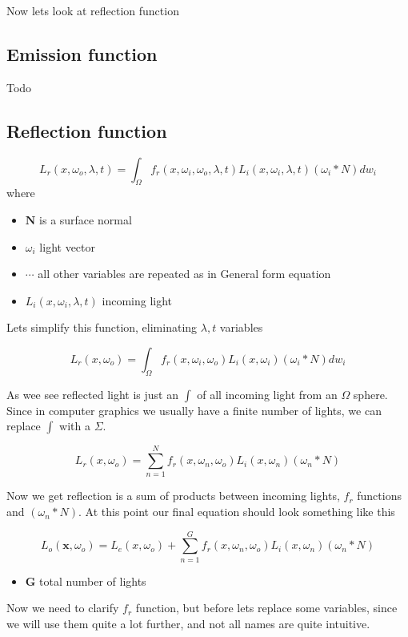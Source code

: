 \documentclass{article}
\begin{document}
Now lets look at reflection function

\subsection{Emission function}
Todo

\subsection{Reflection function}
\[
L_{r}(x, \omega_{o}, \lambda, t) = \int _{\Omega } f_r(x, \omega_{i}, \omega_{o}, \lambda, t) L_{i}(x, \omega_{i}, \lambda, t) (\omega_{i} * N) dw_{i}
\]
where
\begin{itemize}
    \item $\textbf{N}$ is a surface normal
    \item $\omega_{i}$ light vector
    \item $\cdots$ all other variables are repeated as in General form equation
    \item $L_{i}(x, \omega_{i}, \lambda, t)$ incoming light 
\end{itemize}

Lets simplify this function, eliminating $\lambda, t$ variables

\[
L_{r}(x, \omega_{o}) = \int _{\Omega } f_r(x, \omega_{i}, \omega_{o}) L_{i}(x, \omega_{i}) (\omega_{i} * N) dw_{i}
\]


As wee see reflected light is just an $\int$ of all incoming light from an $\Omega$ 
sphere. Since in computer graphics we usually have a finite number of lights, we can replace $\int$ with a $\Sigma$.

\begin{equation}
    L_{r}(x, \omega_{o}) = \sum_{n = 1}^{N} f_r(x, \omega_{n}, \omega_{o}) L_{i}(x, \omega_{n}) (\omega_{n} * N)
\end{equation}

Now we get reflection is a sum of products between incoming lights, $f_r$ functions and $(\omega_{n} * N)$. 
At this point our final equation should look something like this

\[
L_{o}(\textbf{x}, \omega_{o}) = L_{e}(x, \omega_{o}) + \sum_{n = 1}^{G} f_r(x, \omega_{n}, \omega_{o}) L_{i}(x, \omega_{n}) (\omega_{n} * N)
\]
\begin{itemize}
    \item $\textbf{G}$ total number of lights
\end{itemize}

Now we need to clarify $f_r$ function, but before lets replace some variables, 
since we will use them quite a lot further, and not all names are quite intuitive.
\end{document}

